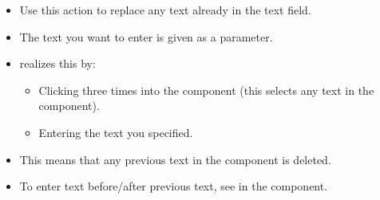 \begin{itemize}
\item Use this action to replace any text already in the text field.
\item The text you want to enter is given as a parameter.
\item \gd{} realizes this by:
\begin{itemize}
\item Clicking three times into the component (this selects any text in the component).
\item Entering the text you specified.
\end{itemize}
\item This means that any previous text in the component is deleted. 
\item To enter text before/after previous text, see  in the  component.
\end{itemize}
 